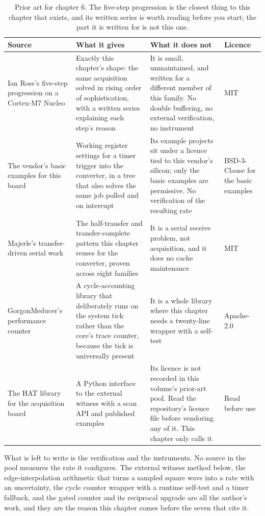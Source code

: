 \begin{table}[H]\centering\small
\begin{tabular}{p{32mm}p{46mm}p{40mm}p{20mm}}
\toprule
Source & What it gives & What it does not & Licence \\
\midrule
Ian Ross's five-step progression on a Cortex-M7 Nucleo & Exactly this chapter's shape: the same acquisition solved in rising order of sophistication, with a written series explaining each step's reason & It is small, unmaintained, and written for a different member of this family. No double buffering, no external verification, no instrument & MIT \\
The vendor's basic examples for this board & Working register settings for a timer trigger into the converter, in a tree that also solves the same job polled and on interrupt & Its example projects sit under a licence tied to this vendor's silicon; only the basic examples are permissive. No verification of the resulting rate & BSD-3-Clause for the basic examples \\
Majerle's transfer-driven serial work & The half-transfer and transfer-complete pattern this chapter reuses for the converter, proven across eight families & It is a serial receive problem, not acquisition, and it does no cache maintenance & MIT \\
GorgonMeducer's performance counter & A cycle-accounting library that deliberately runs on the system tick rather than the core's trace counter, because the tick is universally present & It is a whole library where this chapter needs a twenty-line wrapper with a self-test & Apache-2.0 \\
The HAT library for the acquisition board & A Python interface to the external witness with a scan API and published examples & Its licence is not recorded in this volume's prior-art pool. Read the repository's licence file before vendoring any of it. This chapter only calls it & Read before use \\
\bottomrule
\end{tabular}
\caption{Prior art for chapter 6. The five-step progression is the closest thing to this chapter that exists, and its written series is worth reading before you start; the part it is written for is not this one.}
\end{table}

What is left to write is the verification and the instruments. No source in the
pool measures the rate it configures. The external witness method below, the
edge-interpolation arithmetic that turns a sampled square wave into a rate with
an uncertainty, the cycle counter wrapper with a runtime self-test and a timer
fallback, and the gated counter and its reciprocal upgrade are all the author's
work, and they are the reason this chapter comes before the seven that cite it.


